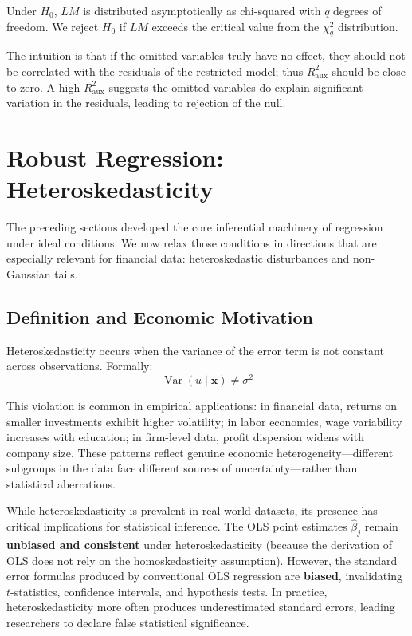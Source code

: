 Under $H_0$, $LM$ is distributed asymptotically as chi-squared with $q$ degrees of freedom. We reject $H_0$ if $LM$ exceeds the critical value from the $\chi^2_q$ distribution.

The intuition is that if the omitted variables truly have no effect, they should not be correlated with the residuals of the restricted model; thus $R_{\text{aux}}^2$ should be close to zero. A high $R_{\text{aux}}^2$ suggests the omitted variables do explain significant variation in the residuals, leading to rejection of the null.


\section{Robust Regression: Heteroskedasticity}

The preceding sections developed the core inferential machinery of regression under ideal conditions. We now relax those conditions in directions that are especially relevant for financial data: heteroskedastic disturbances and non-Gaussian tails.
\subsection{Definition and Economic Motivation}

Heteroskedasticity occurs when the variance of the error term is not constant across observations. Formally:
$$\operatorname{Var}(u \mid \mathbf{x}) \neq \sigma^2$$

This violation is common in empirical applications: in financial data, returns on smaller investments exhibit higher volatility; in labor economics, wage variability increases with education; in firm-level data, profit dispersion widens with company size. These patterns reflect genuine economic heterogeneity---different subgroups in the data face different sources of uncertainty---rather than statistical aberrations.

While heteroskedasticity is prevalent in real-world datasets, its presence has critical implications for statistical inference. The OLS point estimates $\hat{\beta}_j$ remain \textbf{unbiased and consistent} under heteroskedasticity (because the derivation of OLS does not rely on the homoskedasticity assumption). However, the standard error formulas produced by conventional OLS regression are \textbf{biased}, invalidating $t$-statistics, confidence intervals, and hypothesis tests. In practice, heteroskedasticity more often produces underestimated standard errors, leading researchers to declare false statistical significance.
